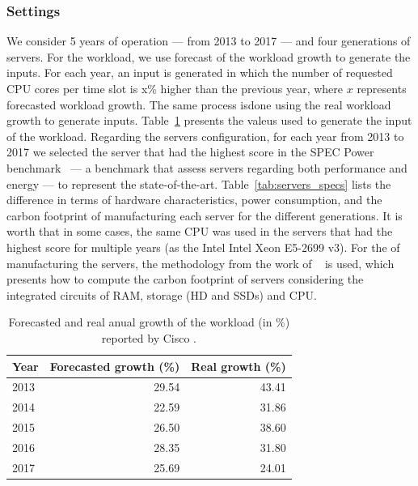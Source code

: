 \subsubsection{Settings}

We consider 5 years of operation --- from 2013 to 2017 ---  and four generations of servers. For the workload, we use forecast of the workload growth to generate the inputs. For each year, an input is generated in which the number of requested CPU cores per time slot is x\% higher than the previous year, where $x$ represents forecasted workload growth. The same process isdone using the real workload growth to generate inputs. Table~\ref{tab:workload_forecast_and_real_growth} presents the valeus used to generate the input of the workload.  Regarding the servers configuration, for each year from 2013 to 2017 we selected the server that had the highest score in the SPEC Power benchmark~\cite{spec_power} --- a benchmark that assess servers regarding both performance and energy --- to represent the state-of-the-art. Table~\ref{tab:servers_specs} lists the difference in terms of hardware characteristics, power consumption, and the carbon footprint of manufacturing each server for the different generations.  It is worth  that in some cases, the same CPU was used in the servers that had the highest score for multiple years (as the Intel Intel Xeon E5-2699 v3). For the  of manufacturing the servers, the methodology from the work of ~\citet{gupta2022_ACT} is used, which presents how to compute the carbon footprint of servers considering the integrated circuits of  RAM, storage (HD and SSDs) and CPU.


\begin{table}[h]
  \caption{Forecasted and real anual growth of the workload (in \%) reported by Cisco \cite{cisco_global_cloud_index_2012,cisco_global_cloud_index_2013,cisco_global_cloud_index_2014,cisco_global_cloud_index_2015,cisco_global_cloud_index_2018}.} \centering
  \label{tab:workload_forecast_and_real_growth} 
  \begin{tabular}{|l|r|r|}
  \hline    
    \textbf{Year} & \textbf{Forecasted growth (\%)} &   \textbf{Real growth (\%)}  \\
  \hline
   2013     & 29.54 & 43.41 \\
  \hline
   2014    & 22.59 & 31.86 \\
  \hline
   2015 &    26.50 & 38.60 \\
  \hline
  2016   & 28.35 & 31.80 \\
  \hline
  2017   & 25.69 & 24.01 \\
  \hline  
\end{tabular}  
\end{table}




